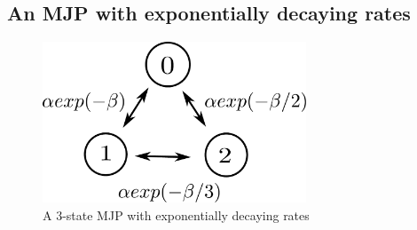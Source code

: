\subsection{An MJP with exponentially decaying rates}
  \begin{figure}[H]
  \centering
  \begin{minipage}[!hp]{0.45\linewidth}
  \centering
    \includegraphics [width=0.70\textwidth, angle=0]{figs/exp_model.pdf}
      \end{minipage}
    \caption{A 3-state MJP with exponentially decaying rates}
    \label{fig:exp_model}
  \end{figure}

